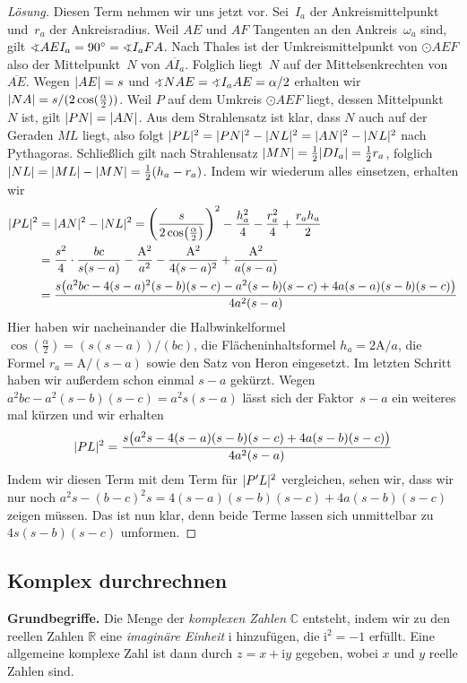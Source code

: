 \begin{proof}[Lösung]
	Diesen Term nehmen wir uns jetzt vor. Sei~$I_a$ der Ankreismittelpunkt und~$r_a$ der Ankreisradius. Weil $AE$ und $AF$ Tangenten an den Ankreis~$\omega_a$ sind, gilt $\winkel AEI_a=90^\circ=\winkel I_aFA$. Nach Thales ist der Umkreismittelpunkt von $\odot AEF$ also der Mittelpunkt~$N$ von $\overline{AI_a}$. Folglich liegt~$N$ auf der Mittelsenkrechten von $\overline{AE}$. Wegen $\lvert AE\rvert=s$ und $\winkel NAE=\winkel I_aAE=\alpha/2$ erhalten wir $\lvert NA\rvert=s/(2\cos(\frac\alpha2))$. Weil $P$ auf dem Umkreis $\odot AEF$ liegt, dessen Mittelpunkt~$N$ ist, gilt $\lvert PN\rvert=\lvert AN\rvert$. Aus dem Strahlensatz ist klar, dass $N$ auch auf der Geraden $ML$ liegt, also folgt $\lvert PL\rvert^2=\lvert PN\rvert^2-\lvert NL\rvert^2=\lvert AN\rvert^2-\lvert NL\rvert^2$ nach Pythagoras. Schließlich gilt nach Strahlensatz $\lvert MN\rvert=\frac12\lvert DI_a\rvert=\frac12r_a$, folglich $\lvert NL\rvert=\lvert ML\rvert-\lvert MN\rvert=\frac12(h_a-r_a)$. Indem wir wiederum alles einsetzen, erhalten wir
	\begin{align*}
		\abs{PL}^2&=\abs{AN}^2-\abs{NL}^2=\parens*{\frac{s}{2\cos\parens[\big]{\frac\alpha2}}}^2-\frac{h_a^2}{4}-\frac{r_a^2}{4}+\frac{r_ah_a}{2}\\
		&=\frac{s^2}{4}\cdot\frac{bc}{s(s-a)}-\frac{\mathrm{A}^2}{a^2}-\frac{\mathrm{A}^2}{4(s-a)^2}+\frac{\mathrm{A}^2}{a(s-a)}\\
		&=\frac{s\parens*{a^2bc-4(s-a)^2(s-b)(s-c)-a^2(s-b)(s-c)+4a(s-a)(s-b)(s-c)}}{4a^2(s-a)}
	\end{align*}
	Hier haben wir nacheinander die Halbwinkelformel $\cos(\frac\alpha2)=(s(s-a))/(bc)$, die Flächeninhaltsformel $h_a=2\mathrm{A}/a$, die Formel $r_a=\mathrm{A}/(s-a)$ sowie den Satz von Heron eingesetzt. Im letzten Schritt haben wir außerdem schon einmal $s-a$ gekürzt. Wegen $a^2bc-a^2(s-b)(s-c)=a^2s(s-a)$ lässt sich der Faktor~$s-a$ ein weiteres mal kürzen und wir erhalten
	\begin{equation*}
		\abs{PL}^2=\frac{s\parens*{a^2s-4(s-a)(s-b)(s-c)+4a(s-b)(s-c)}}{4a^2(s-a)}
	\end{equation*}
	Indem wir diesen Term mit dem Term für $\lvert P'L\rvert^2$ vergleichen, sehen wir, dass wir nur noch $a^2s-(b-c)^2s=4(s-a)(s-b)(s-c)+4a(s-b)(s-c)$ zeigen müssen. Das ist nun klar, denn beide Terme lassen sich unmittelbar zu $4s(s-b)(s-c)$ umformen.
\end{proof}

\subsection*{Komplex durchrechnen}
\textbf{Grundbegriffe.} Die Menge der \emph{komplexen Zahlen} $\mathbb C$ entsteht, indem wir zu den reellen Zahlen $\mathbb R$ eine \emph{imaginäre Einheit} $\mathrm{i}$ hinzufügen, die $\mathrm{i}^2=-1$ erfüllt. Eine allgemeine komplexe Zahl ist dann durch $z=x+\mathrm{i}y$ gegeben, wobei $x$ und $y$ reelle Zahlen sind.


